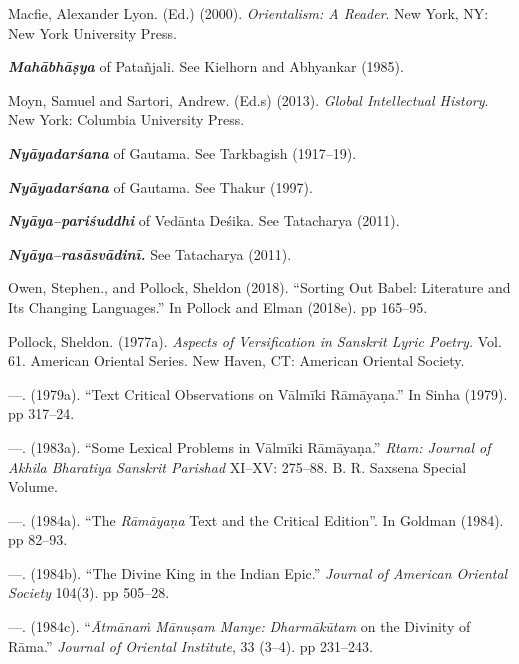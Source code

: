 \begin{thebibliography}{99}
 \item Macfie, Alexander Lyon. (Ed.) (2000).\textit{ Orientalism: A Reader}. New York, NY: New York University Press.

 \item \textit{\textbf{Mahābhāṣya}} of Patañjali. See Kielhorn and Abhyankar (1985).

 \item Moyn, Samuel and Sartori, Andrew. (Ed.s) (2013).\textit{ Global Intellectual History}. New York: Columbia University Press.

 \item \textit{\textbf{Nyāyadarśana}} of Gautama. See Tarkbagish (1917–19).

 \item \textit{\textbf{Nyāyadarśana}} of Gautama. See Thakur (1997).

 \item \textit{\textbf{Nyāya–pariśuddhi}} of Vedānta Deśika. See Tatacharya (2011).

 \item \textit{\textbf{Nyāya–rasāsvādinī.}} See Tatacharya (2011).

 \item Owen, Stephen., and Pollock, Sheldon (2018). “Sorting Out Babel: Literature and Its Changing Languages.” In Pollock and Elman (2018e). pp 165–95.

 \item Pollock, Sheldon. (1977a). \textit{Aspects of Versification in Sanskrit Lyric Poetry.} Vol. 61. American Oriental Series. New Haven, CT: American Oriental Society.

 \item —. (1979a). “Text Critical Observations on Vālmīki Rāmāyaṇa.” In Sinha (1979). pp 317–24.

 \item —. (1983a). “Some Lexical Problems in Vālmīki Rāmāyaṇa.” \textit{Rtam: Journal of Akhila Bharatiya Sanskrit Parishad} XI–XV: 275–88. B. R. Saxsena Special Volume. 

 \item —. (1984a). “The \textit{Rāmāyaṇa} Text and the Critical Edition”. In Goldman (1984). pp 82–93.

 \item —. (1984b). “The Divine King in the Indian Epic.” \textit{Journal of American Oriental Society} 104(3). pp 505–28.

 \item —. (1984c). “\textit{Ātmānaṁ Mānuṣam Manye:} \textit{Dharmākūtam} on the Divinity of Rāma.” \textit{Journal of Oriental Institute}, 33 (3–4). pp 231–243.


\end{thebibliography}
